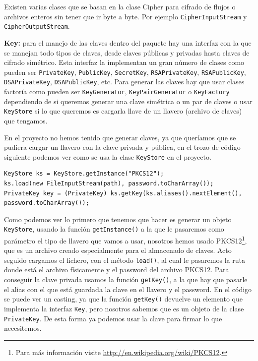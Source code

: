 Existen varias clases que se basan en la clase Cipher para cifrado de flujos o archivos enteros sin tener que ir byte a byte. Por ejemplo \lstinline{CipherInputStream} y \lstinline{CipherOutputStream}. 

\textbf{Key:} para el manejo de las claves dentro del paquete hay una interfaz con la que se manejan todo tipos de claves, desde claves públicas y privadas hasta claves de cifrado simétrico. Esta interfaz la implementan un gran número de clases como pueden ser \lstinline{PrivateKey}, \lstinline{PublicKey}, \lstinline{SecretKey}, \lstinline{RSAPrivateKey}, \lstinline{RSAPublicKey}, \lstinline{DSAPrivateKey}, \lstinline{DSAPublicKey}, etc. Para generar las claves hay que usar clases factoría como pueden ser \lstinline{KeyGenerator}, \lstinline{KeyPairGenerator} o \lstinline{KeyFactory} dependiendo de si queremos generar una clave simétrica o un par de claves o usar \lstinline{KeyStore} si lo que queremos es cargarla llave de un llavero (archivo de claves) que tengamos.

En el proyecto no hemos tenido que generar claves, ya que queríamos que se pudiera cargar un llavero con la clave privada y pública, en el trozo de código siguiente podemos ver como se usa la clase \lstinline{KeyStore} en el proyecto.

\begin{lstlisting}[style=Java] 
KeyStore ks = KeyStore.getInstance("PKCS12");
ks.load(new FileInputStream(path), password.toCharArray());
PrivateKey key = (PrivateKey) ks.getKey(ks.aliases().nextElement(), password.toCharArray());
\end{lstlisting}

Como podemos ver lo primero que tenemos que hacer es generar un objeto \lstinline{KeyStore}, usando la función \lstinline{getInstance()} a la que le pasaremos como parámetro el tipo de llavero que vamos a usar, nosotros hemos usado PKCS12\footnote{Para más información visite \url{http://en.wikipedia.org/wiki/PKCS12}.}, que es un archivo creado especialmente para el almacenado de claves. Acto seguido cargamos el fichero, con el método \lstinline{load()}, al cual le pasaremos la ruta donde está el archivo físicamente y el password del archivo PKCS12. Para conseguir la clave privada usamos la función \lstinline{getKey()}, a la que hay que pasarle el alias con el que está guardada la clave en el llavero y el password. En el código se puede ver un casting, ya que la función \lstinline{getKey()} devuelve un elemento que implementa la interfaz \lstinline{Key}, pero nosotros sabemos que es un objeto de la clase \lstinline{PrivateKey}. De esta forma ya podemos usar la clave para firmar lo que necesitemos.


